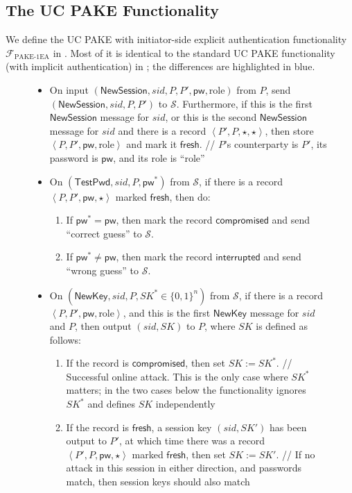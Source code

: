 \documentclass{article}
\theoremstyle{plain}
\theoremstyle{definition}
\theoremstyle{remark}
\renewcommand{\sim}{\mathcal{S}}
\newcommand{\func}{\mathcal{F}}
\newcommand{\Fpake}{\func_\mathrm{PAKE\text{-}1EA}}
\newcommand{\pw}{\mathsf{pw}}
\newcommand{\NewSession}{\mathsf{NewSession}}
\newcommand{\TestPwd}{\mathsf{TestPwd}}
\newcommand{\NewKey}{\mathsf{NewKey}}
\newcommand{\fresh}{\mathsf{fresh}}
\newcommand{\compromised}{\mathsf{compromised}}
\newcommand{\interrupted}{\mathsf{interrupted}}
\begin{document}
\subsection{The UC PAKE Functionality}
We define the UC PAKE with initiator-side explicit authentication functionality $\Fpake$ in . Most of it is identical to the standard UC PAKE functionality (with implicit authentication) in \cite{EC:CHKLM05}; the differences are highlighted in {\color{blue}blue}.

\begin{figure}[H]
\begin{framed}
\begin{small}
\begin{itemize}
  \item On input $(\NewSession, sid, P, P', \pw, \text{role})$ from $P$, send $(\NewSession, sid, P,\allowbreak P')$ to $\sim$. Furthermore, if this is the first $\NewSession$ message for $sid$, or this is the second $\NewSession$ message for $sid$ and there is a record $\left<P',P,\star,\star\right>$, then store $\left<P,P',\pw,\text{role}\right>$ and mark it $\fresh$. \quad \textcolor[gray]{0.5}{// $P$'s counterparty is $P'$, its password is $\pw$, and its role is ``role''}
  \item On $(\TestPwd, sid, P, \pw^*)$ from $\sim$, if there is a record $\left<P,P',\pw,\star\right>$ marked $\fresh$, then do:
      \begin{enumerate}
        \item If $\pw^* = \pw$, then mark the record $\compromised$ and send ``correct guess'' to $\sim$.
        \item If $\pw^* \neq \pw$, then mark the record $\interrupted$ and send ``wrong guess'' to $\sim$.
      \end{enumerate}
        \item On $(\NewKey, sid, P, SK^* \in \{0,1\}^n)$ from $\sim$, if there is a record $\left<P,P',\pw,\text{role}\right>$, and this is the first $\NewKey$ message for $sid$ and $P$, then output $(sid, SK)$ to $P$, where $SK$ is defined as follows:
            \begin{enumerate}
              \item If the record is $\compromised$, then set $SK := SK^*$. \quad \textcolor[gray]{0.5}{// Successful online attack. This is the only case where $SK^*$ matters; in the two cases below the functionality ignores $SK^*$ and defines $SK$ independently}
              \item If the record is $\fresh$, a session key $(sid, SK')$ has been output to $P'$, at which time there was a record $\left<P',P,\pw,\star\right>$ marked $\fresh$, then set $SK := SK'$. \quad \textcolor[gray]{0.5}{// If no attack in this session in either direction, and passwords match, then session keys should also match}

\end{enumerate}
\end{itemize}
\end{small}
\end{framed}
\end{figure}
\end{document}
